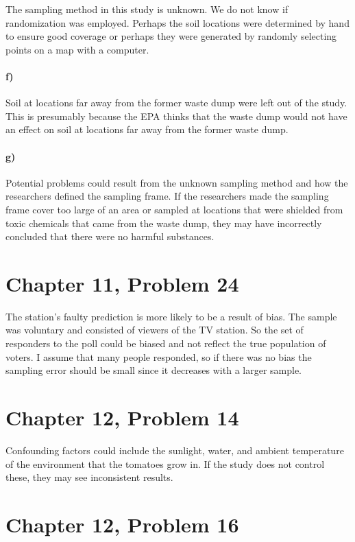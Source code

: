 \documentclass[12pt]{article}
\begin{document}
The sampling method in this study is unknown. We do not know if randomization
was employed. Perhaps the soil locations were determined by hand to ensure good
coverage or perhaps they were generated by randomly selecting points on a map with
a computer.

\paragraph{f)}

Soil at locations far away from the former waste dump were left out of the study.
This is presumably because the EPA thinks that the waste dump would not have
an effect on soil at locations far away from the former waste dump.

\paragraph{g)}

Potential problems could result from the unknown sampling method and how the researchers
defined the sampling frame. If the researchers made the sampling frame cover too large of an
area or sampled at locations that were shielded from toxic chemicals that came from the waste
dump, they may have incorrectly concluded that there were no harmful substances.

\section*{Chapter 11, Problem 24}

The station's faulty prediction is more likely to be a result of bias.
The sample was voluntary and consisted of viewers of the TV station. So the set of
responders to the poll could be biased and not reflect the true population of voters.
I assume that many people responded, so if there was no bias the sampling error
should be small since it decreases with a larger sample.

\section*{Chapter 12, Problem 14}

Confounding factors could include the sunlight, water, and ambient temperature
of the environment that the tomatoes grow in. If the study does not control
these, they may see inconsistent results.

\section*{Chapter 12, Problem 16}
\end{document}
